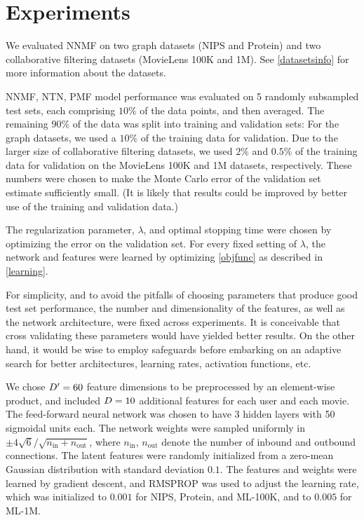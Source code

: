 \documentclass{article} \usepackage{iclr2016_conference,times}
\newcommand{\NA}[1]{#1}
\begin{document}
\section{Experiments}
\label{experiments}

We evaluated NNMF on two graph datasets (NIPS and Protein) and two collaborative filtering datasets (MovieLens 100K and 1M).  See \cref{datasetsinfo} for more information about the datasets.

NNMF, NTN, PMF model performance was evaluated on 5 randomly subsampled test sets, each comprising $10\%$ of the data points, and then averaged. 
The remaining $90 \%$ of the data was split into training and validation sets:
For the graph datasets, we used a $10\%$ of the training data for validation.
Due to the larger size of collaborative filtering datasets, we used $2\%$ and $0.5\%$ of the training data for validation on the MovieLens 100K and 1M datasets, respectively. These numbers were chosen to make the Monte Carlo error of the validation set estimate sufficiently small. \NA{(It is likely that results could be improved by better use of the training and validation data.)}

The regularization parameter, $\lambda$, and optimal stopping time were chosen by optimizing the error on the validation set.  For every fixed setting of $\lambda$, the network and features were learned by optimizing
\cref{objfunc} as described in \cref{learning}.

For simplicity, and to avoid the pitfalls of choosing parameters that produce good test set performance, 
the number and dimensionality of the features, as well as the network architecture, were fixed across experiments. It is conceivable that cross validating these parameters would have yielded better results.  
On the other hand, it would be wise to employ safeguards \citep{Dwork07082015} before embarking on an adaptive search for better architectures, learning rates, activation functions, etc.

We chose ${D'}=60$ feature dimensions to be preprocessed by an element-wise product, and included $D=10$ additional features for each user and each movie. 
The feed-forward neural network was chosen to have 3 hidden layers with 50 sigmoidal units each.
The network weights were sampled uniformly in $\pm 4 \sqrt {6} /  \sqrt {n_{\mathrm{in}} + n_{\mathrm{out}}}$, where
$n_{\mathrm{in}}$, $n_{\mathrm{out}}$ denote the number of inbound and outbound connections.
The latent features were randomly initialized from a zero-mean Gaussian distribution with standard deviation $0.1$.  
The features and weights were learned by gradient descent, and RMSPROP was used to adjust the learning rate, which was initialized to $0.001$ for NIPS, Protein, and ML-100K, and to $0.005$ for ML-1M.
\end{document}
